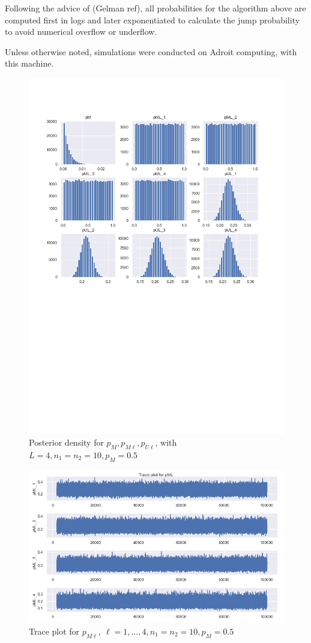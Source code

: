 \documentclass[11pt,reqno]{amsart}
\begin{document}
Following the advice of (Gelman ref), all probabilities for the algorithm above are computed first in logs and later exponentiated to calculate the jump probability to avoid numerical overflow or underflow. 

Unless otherwise noted, simulations were conducted on Adroit computing, with this machine.  

\newpage
\begin{figure}[h!]
   \centering
   \includegraphics[width=\textwidth]{../Figures/allParam_nM10_L4.png} %
   \caption{Posterior density for $p_M, p_{M\ell}, p_{U\ell}$, with $L=4, n_1=n_2 = 10, p_M = 0.5$}
   \label{fig:example}
\end{figure}
\begin{figure}[h!]
   \centering
   \includegraphics[width=\textwidth]{../Figures/traceML_nM10_L4.png} %
   \caption{Trace plot for $p_{M\ell}, \ \ell=1,\dots,4, n_1=n_2 = 10, p_M = 0.5$}
   \label{fig:example}
\end{figure}
\end{document}
